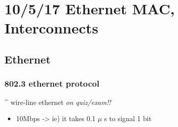 \documentclass[11pt]{article}
\begin{document}
\section{10/5/17  Ethernet MAC, Interconnects}
\label{sec:orgheadline45}

\subsection{Ethernet}
\label{sec:orgheadline42}

\subsubsection{802.3 ethernet protocol}
\label{sec:orgheadline39}
\^{} wire-line ethernet \emph{on quiz/exam!!}
\begin{itemize}
\item 10Mbps -> ie) it takes 0.1 \(\mu\) s to signal 1 bit
\end{itemize}
\end{document}

